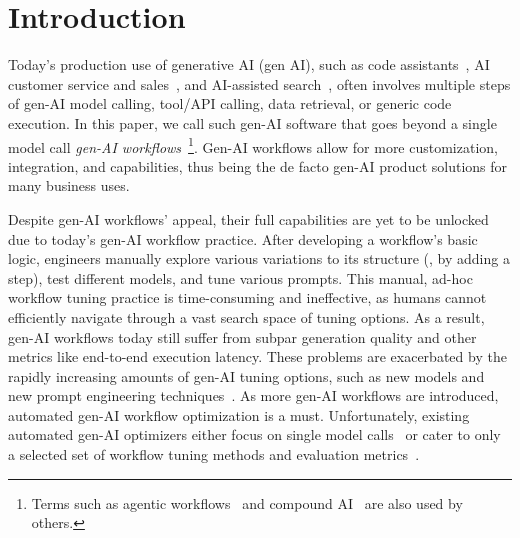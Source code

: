 
\section{Introduction}
\label{sec:intro}

Today's production use of generative AI (gen AI), such as code assistants~\cite{devin}, AI customer service and sales~\cite{salesforce-agentforce}, and AI-assisted search~\cite{vertex_ai_search}, often involves multiple steps of gen-AI model calling, tool/API calling, data retrieval, or generic code execution. 
In this paper, we call such gen-AI software that goes beyond a single model call {\em gen-AI workflows}~\footnote{Terms such as agentic workflows~\cite{andrew_ng_ai_agentic_workflows} and compound AI~\cite{databricks-compound-ai} are also used by others.}.
Gen-AI workflows allow for more customization, integration, and capabilities, thus being the de facto gen-AI product solutions for many business uses.

Despite gen-AI workflows' appeal, their full capabilities are yet to be unlocked due to today's gen-AI workflow practice.
After developing a workflow's basic logic, engineers manually explore various variations to its structure (\eg, by adding a step), test different models, and tune various prompts.
This manual, ad-hoc workflow tuning practice is time-consuming and ineffective, as humans cannot efficiently navigate through a vast search space of tuning options. As a result, gen-AI workflows today still suffer from subpar generation quality and other metrics like end-to-end execution latency. These problems are exacerbated by the rapidly increasing amounts of gen-AI tuning options, such as new models and new prompt engineering techniques~\cite{yao2022react,yao2023tree}.
As more gen-AI workflows are introduced, automated gen-AI workflow optimization is a must. 
Unfortunately, existing automated gen-AI optimizers either focus on single model calls~\cite{routellm,tensor-opera-router} or cater to only a selected set of workflow tuning methods and evaluation metrics~\cite{khattab2024dspy,Trace,textgrad,symbolic}.

